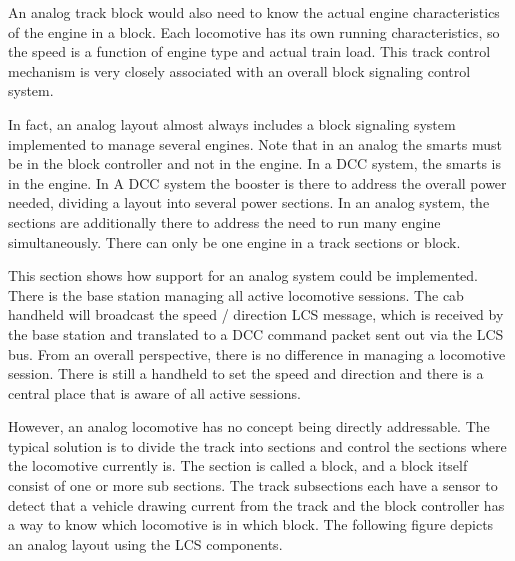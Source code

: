 An analog track block would also need to know the actual engine characteristics of the engine in a block. Each locomotive has its own running characteristics, so the speed is a function of engine type and actual train load. This track control mechanism is very closely associated with an overall block signaling control system. 

In fact, an analog layout almost always includes a block signaling system implemented to manage several engines. Note that in an analog the smarts must be in the block controller and not in the engine. In a DCC system, the smarts is in the engine. In A DCC system the booster is there to address the overall power needed, dividing a layout into several power sections. In an analog system, the sections are additionally there to address the need to run many engine simultaneously. There can only be one engine in a track sections or block.



This section shows how support for an analog system could be implemented. There is the base station managing all active locomotive sessions. The cab handheld will broadcast the speed / direction LCS message, which is received by the base station and translated to a DCC command packet sent out via the LCS bus. From an overall perspective, there is no difference in managing a locomotive session. There is still a handheld to set the speed and direction and there is a central place that is aware of all active sessions.

However, an analog locomotive has no concept being directly addressable. The typical solution is to divide the track into sections and control the sections where the locomotive currently is. The section is called a block, and a block itself consist of one or more sub sections. The track subsections each have a sensor to detect that a vehicle drawing current from the track and the block controller has a way to know which locomotive is in which block. The following figure depicts an analog layout using the LCS components.

